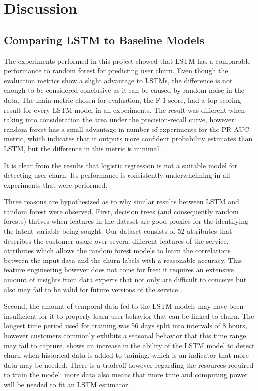 \documentclass{kththesis}
\begin{document}
\chapter{Discussion}
\label{cha:discussion}

\section{Comparing LSTM to Baseline Models}
\label{sec:dis_lstm_baseline}

The experiments performed in this project showed that LSTM has a comparable performance to random forest for predicting user churn. Even though the evaluation metrics show a slight advantage to LSTMs, the difference is not enough to be considered conclusive as it can be caused by random noise in the data. The main metric chosen for evaluation, the F-1 score, had a top scoring result for every LSTM model in all experiments. The result was different when taking into consideration the area under the precision-recall curve, however: random forest has a small advantage in number of experiments for the PR AUC metric, which indicates that it outputs more confident probability estimates than LSTM, but the difference in this metric is minimal. 

It is clear from the results that logistic regression is not a suitable model for detecting user churn. Its performance is consistently underwhelming in all experiments that were performed.

Three reasons are hypothesized as to why similar results between LSTM and random forest were observed. First, decision trees (and consequently random forests) thrives when features in the dataset are good proxies for the identifying the latent variable being sought. Our dataset consists of 52 attributes that describes the customer usage over several different features of the service, attributes which allows the random forest models to learn the correlations between the input data and the churn labels with a reasonable accuracy. This feature engineering however does not come for free: it requires an extensive amount of insights from data experts that not only are difficult to conceive but also may fail to be valid for future versions of the service .

Second, the amount of temporal data fed to the LSTM models may have been insufficient for it to properly learn user behavior that can be linked to churn. The longest time period used for training was 56 days split into intervals of 8 hours, however customers commonly exhibits a seasonal behavior that this time range may fail to capture.  shows an increase in the ability of the LSTM model to detect churn when historical data is added to training, which is an indicator that more data may be needed. There is a tradeoff however regarding the resources required to train the model: more data also means that more time and computing power will be needed to fit an LSTM estimator.
\end{document}
